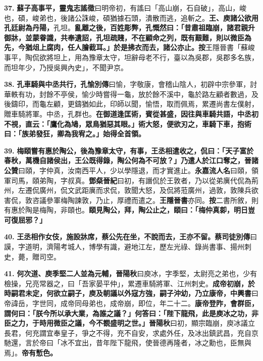 \textbf{37.} \textbf{蘇子高事平，}{\footnotesize \textbf{靈鬼志謠徵}曰明帝初，有謠曰「高山崩，石自破」，高山，峻也，碩，峻弟也，後諸公誅峻，碩猶據石頭，潰散而逃，追斬之。}\textbf{王、庾諸公欲用孔廷尉為丹陽，}{\footnotesize 孔坦。}\textbf{亂離之後，百姓彫弊，孔慨然曰：「昔肅祖臨崩，諸君親升御牀，並蒙眷識，共奉遺詔，孔坦疏賤，不在顧命之列，既有艱難，則以微臣為先，今猶俎上腐肉，任人膾截耳。」於是拂衣而去，諸公亦止。}{\footnotesize \textbf{按}王隱晉書「蘇峻事平，陶侃欲將坦上，用為豫章太守，坦辭母老不行，臺以為吳郡，吳郡多名族，而坦年少，乃授吳興內史」，不聞尹京。}

\textbf{38.} \textbf{孔車騎與中丞共行，}{\footnotesize \textbf{孔愉別傳}曰愉，字敬康，會稽山陰人，初辟中宗參軍，討華軼有功，封餘不亭侯，愉少時嘗得一龜，放於餘不溪中，龜於路左顧者數過，及後鑄印，而龜左顧，更鑄猶如此，印師以聞，愉悟，取而佩焉，累遷尚書左僕射，贈車騎將軍。中丞，孔群也。}\textbf{在御道逢匡術，賓從甚盛，因往與車騎共語，中丞初不視，直云：「鷹化為鳩，眾鳥猶惡其眼。」術大怒，便欲刃之，車騎下車，抱術曰：「族弟發狂，卿為我宥之。」始得全首領。}

\textbf{39.} \textbf{梅頤嘗有惠於陶公，後為豫章太守，有事，王丞相遣收之，侃曰：「天子富於春秋，萬機自諸侯出，王公既得錄，陶公何為不可放？」乃遣人於江口奪之，}{\footnotesize \textbf{晉諸公贊}曰頤，字仲真，汝南西平人，少以學隱退，而才實進止。\textbf{永嘉流人名}曰頤，領軍司馬，頤弟陶，字叔真。\textbf{鄧粲晉紀}曰初，有譖侃於王敦者，乃以從弟廙代侃為荊州，左遷侃廣州，侃文武距廙而求侃，敦聞大怒，及侃將蒞廣州，過敦，敦陳兵欲害侃，敦咨議參軍梅陶諫敦，乃止，厚禮而遣之。\textbf{王隱晉書}亦同。\textbf{按}二書所敘，則有惠於陶是梅陶，非頤也。}\textbf{頤見陶公，拜，陶公止之，頤曰：「梅仲真厀，明日豈可復屈邪？」}

\textbf{40.} \textbf{王丞相作女伎，施設牀席，蔡公先在坐，不說而去，王亦不留。}{\footnotesize \textbf{蔡司徒別傳}曰謨，字道明，濟陽考城人，博學有識，避地江左，歷左光祿、錄尚書事、揚州刺史，薨，贈司空。}

\textbf{41.} \textbf{何次道、庾季堅二人並為元輔，}{\footnotesize \textbf{晉陽秋}曰庾冰，字季堅，太尉亮之弟也，少有檢操，兄亮常器之，曰「吾家晏平仲」，累遷車騎將軍、江州刺史。}\textbf{成帝初崩，於時嗣君未定，何欲立嗣子，庾及朝議以外寇方強，嗣子沖幼，乃立康帝，}{\footnotesize \textbf{中興書}曰帝諱岳，字世同，成帝同母弟也，成帝崩，即位，年二十二。}\textbf{康帝登阼，會群臣，謂何曰：「朕今所以承大業，為誰之議？」何答曰：「陛下龍飛，此是庾冰之功，非臣之力，于時用微臣之議，今不覩盛明之世。」}{\footnotesize \textbf{晉陽秋}曰初，顯宗臨崩，庾冰議立長君，何充謂宜奉皇子，爭之不得，充不自安，求處外任，及冰出鎮武昌，充自京馳還，言於帝曰「冰不宜出，昔年陛下龍飛，使晉德再隆者，冰之勳也，臣無與焉」。}\textbf{帝有慙色。}

